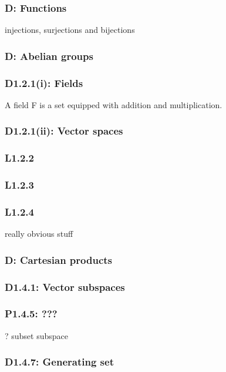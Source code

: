 \documentclass{article}
\begin{document}
\begin{multicols*}{3}
\noindent

\subsubsection*{D: Functions}
injections, surjections and bijections

\subsubsection*{D: Abelian groups}

\subsubsection*{D1.2.1(i): Fields}
A field F is a set equipped with addition
and multiplication.

\subsubsection*{D1.2.1(ii): Vector spaces}

\subsubsection*{L1.2.2}

\subsubsection*{L1.2.3}

\subsubsection*{L1.2.4}
really obvious stuff

\subsubsection*{D: Cartesian products}

\subsubsection*{D1.4.1: Vector subspaces}

\subsubsection*{P1.4.5: ???}
? subset subspace

\subsubsection*{D1.4.7: Generating set}


\end{multicols*}
\end{document}
